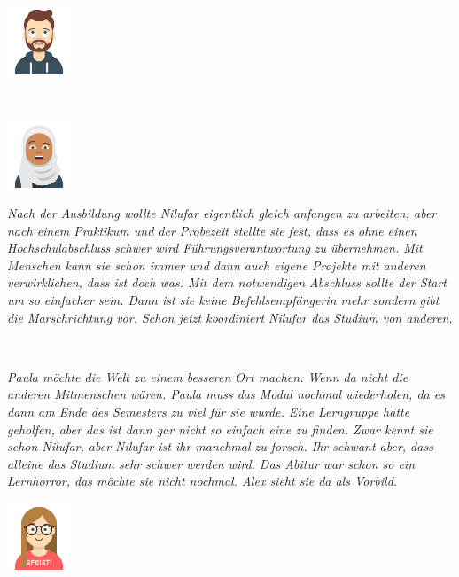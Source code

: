 \documentclass[a4paper, 9pt]{scrartcl}\usepackage[]{graphicx}\usepackage[]{xcolor}
\begin{document}
\begin{minipage}[c]{0.125\textwidth}
\includegraphics[width = 1.9cm]{avatare/Mark}
\end{minipage}\\[2.75Ex]
\begin{minipage}[c]{0.125\textwidth}
\includegraphics[width = 1.9cm]{avatare/Nilufar}
\end{minipage}
\begin{minipage}[c]{0.875\textwidth}
\textit{Nach der Ausbildung wollte Nilufar eigentlich gleich anfangen zu arbeiten, aber nach einem Praktikum und der Probezeit stellte sie fest, dass es ohne einen Hochschulabschluss schwer wird Führungsverantwortung zu übernehmen. Mit Menschen kann sie schon immer und dann auch eigene Projekte mit anderen verwirklichen, dass ist doch was. Mit dem notwendigen Abschluss sollte der Start um so einfacher sein. Dann ist sie keine Befehlsempfängerin mehr sondern gibt die Marschrichtung vor. Schon jetzt koordiniert Nilufar das Studium von anderen.}
\end{minipage}\\[2.75Ex]
\begin{minipage}[c]{0.875\textwidth}
\textit{Paula möchte die Welt zu einem besseren Ort machen. Wenn da nicht die anderen Mitmenschen wären. Paula muss das Modul nochmal wiederholen, da es dann am Ende des Semesters zu viel für sie wurde. Eine Lerngruppe hätte geholfen, aber das ist dann gar nicht so einfach eine zu finden. Zwar kennt sie schon Nilufar, aber Nilufar ist ihr manchmal zu forsch. Ihr schwant aber, dass alleine das Studium sehr schwer werden wird. Das Abitur war schon so ein Lernhorror, das möchte sie nicht nochmal. Alex sieht sie da als Vorbild.}
\end{minipage}
\begin{minipage}[c]{0.125\textwidth}
\includegraphics[width = 1.9cm]{avatare/Paula}
\end{minipage}\\[2.75Ex]
\end{document}
